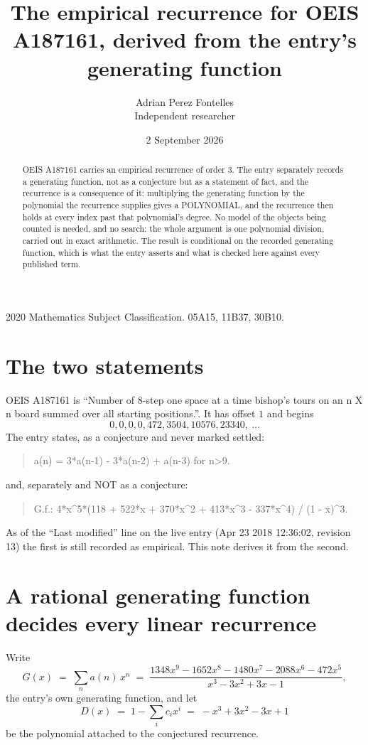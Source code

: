 \documentclass[11pt,a4paper]{article}
\title{The empirical recurrence for OEIS A187161, derived from the entry's generating function}
\author{Adrian Perez Fontelles\\ \small Independent researcher}
\date{2 September 2026}
\theoremstyle{plain}
\theoremstyle{definition}
\begin{document}
\maketitle

\begin{abstract}
OEIS A187161 carries an empirical recurrence of order $3$. The entry separately records a
generating function, not as a conjecture but as a statement of fact, and the recurrence is a
consequence of it: multiplying the generating function by the polynomial the recurrence
supplies gives a POLYNOMIAL, and the recurrence then holds at every index past that
polynomial's degree. No model of the objects being counted is needed, and no search: the
whole argument is one polynomial division, carried out in exact arithmetic. The result is
conditional on the recorded generating function, which is what the entry asserts and what is
checked here against every published term.
\end{abstract}

\noindent\small 2020 Mathematics Subject Classification. 05A15, 11B37, 30B10.\normalsize

\section{The two statements}

OEIS A187161 is ``Number of 8-step one space at a time bishop's tours on an n X n board summed over all starting positions.''. It has offset $1$ and begins
\[
0, 0, 0, 0, 472, 3504, 10576, 23340,\ \dots
\]
The entry states, as a conjecture and never marked settled:
\begin{quote}
a(n) = 3*a(n-1) - 3*a(n-2) + a(n-3) for n>9.
\end{quote}
and, separately and NOT as a conjecture:
\begin{quote}
G.f.: 4*x\^{}5*(118 + 522*x + 370*x\^{}2 + 413*x\^{}3 - 337*x\^{}4) / (1 - x)\^{}3.
\end{quote}
As of the ``Last modified'' line on the live entry (Apr 23 2018 12:36:02, revision 13) the first is still
recorded as empirical. This note derives it from the second.

\section{A rational generating function decides every linear recurrence}

Write
\[
G(x)\;=\;\sum_{n}a(n)\,x^{n}\;=\;\frac{1348 x^{9} - 1652 x^{8} - 1480 x^{7} - 2088 x^{6} - 472 x^{5}}{x^{3} - 3 x^{2} + 3 x - 1},
\]
the entry's own generating function, and let
\[
D(x)\;=\;1-\sum_i c_i x^{i}\;=\;- x^{3} + 3 x^{2} - 3 x + 1
\]
be the polynomial attached to the conjectured recurrence.
\end{document}
